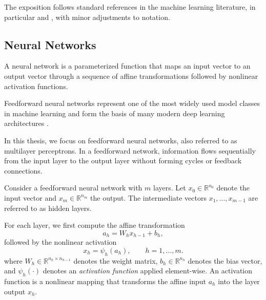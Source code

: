 The exposition follows standard references in the machine learning literature, in particular \citet{Bishop2006} and \citet{Goodfellow2016}, with minor adjustments to notation.



\subsection{Neural Networks}

A neural network is a parameterized function that maps an input vector to an output vector through a sequence of affine transformations followed by nonlinear activation functions.

Feedforward neural networks represent one of the most widely used model classes in machine learning and form the basis of many modern deep learning architectures \citep{Goodfellow2016}.

In this thesis, we focus on feedforward neural networks, also referred to as multilayer perceptrons. In a feedforward network, information flows sequentially from the input layer to the output layer without forming cycles or feedback connections.

Consider a feedforward neural network with $m$ layers. Let $x_0 \in \mathbb{R}^{n_0}$ denote the input vector and $x_m \in \mathbb{R}^{n_m}$ the output. The intermediate vectors $x_1,\ldots,x_{m-1}$ are referred to as hidden layers.

For each layer, we first compute the affine transformation
\begin{equation}
a_h = W_h x_{h-1} + b_h,
\end{equation}
followed by the nonlinear activation
\begin{equation}
x_h = \psi_h(a_h), \qquad h = 1,\dots,m.
\end{equation}
where $W_h \in \mathbb{R}^{n_h \times n_{h-1}}$ denotes the weight matrix, $b_h \in \mathbb{R}^{n_h}$ denotes the bias vector, and $\psi_h(\cdot)$ denotes an \emph{activation function} applied element-wise. An activation function is a nonlinear mapping that transforms the affine input $a_h$ into the layer output $x_h$.

